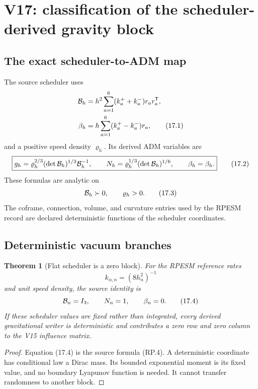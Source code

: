 \documentclass[11pt]{article}
\newtheorem{theorem}{Theorem}[section]
\theoremstyle{remark}
\begin{document}
\section{V17: classification of the scheduler-derived gravity block}
\label{sec:v17v17}

\subsection{The exact scheduler-to-ADM map}

The source scheduler uses
\[
\begin{aligned}
 {\cal B}_h
 &=h^2\sum_{a=1}^{6}(k_a^++k_a^-)r_ar_a^{\mathsf T},\\
 \beta_h
 &=h\sum_{a=1}^{6}(k_a^+-k_a^-)r_a,               \tag{17.1}
\end{aligned}
\]
and a positive speed density \(\varrho_h\).  Its derived ADM
variables are
\[
\boxed{
 g_h=\varrho_h^{2/3}(\det{\cal B}_h)^{1/3}{\cal B}_h^{-1},
 \qquad
 N_h=\varrho_h^{1/3}(\det{\cal B}_h)^{1/6},
 \qquad
 \beta_h=\beta_h.}                                  \tag{17.2}
\]
These formulas are analytic on
\[
 {\cal B}_h\succ0,\qquad\varrho_h>0.                \tag{17.3}
\]
The coframe, connection, volume, and curvature entries used by the
RPESM record are declared deterministic functions of the scheduler
coordinates.

\subsection{Deterministic vacuum branches}

\begin{theorem}[Flat scheduler is a zero block]
\label{thm:v17v17-flat}
For the RPESM reference rates
\[
 k_{\alpha,n}=(8h_n^2)^{-1}
\]
and unit speed density, the source identity is
\[
 {\cal B}_n=I_3,\qquad N_n=1,\qquad\beta_n=0.       \tag{17.4}
\]
If these scheduler values are fixed rather than integrated, every
derived gravitational writer is deterministic and contributes a
zero row and zero column to the V15 influence matrix.
\end{theorem}

\begin{proof}
Equation (17.4) is the source formula \textup{(RP.4)}.  A
deterministic coordinate has conditional law a Dirac mass.  Its
bounded exponential moment is its fixed value, and no boundary
Lyapunov function is needed.  It cannot transfer randomness to
another block.
\end{proof}
\end{document}
